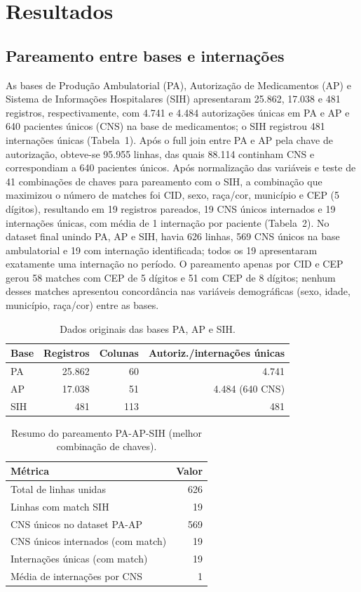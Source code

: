 \documentclass[11pt,a4paper]{article}
\begin{document}
\section*{Resultados}

\subsection*{Pareamento entre bases e internações}

As bases de Produção Ambulatorial (PA), Autorização de Medicamentos (AP) e Sistema de Informações Hospitalares (SIH) apresentaram 25.862, 17.038 e 481 registros, respectivamente, com 4.741 e 4.484 autorizações únicas em PA e AP e 640 pacientes únicos (CNS) na base de medicamentos; o SIH registrou 481 internações únicas (Tabela~1). Após o full join entre PA e AP pela chave de autorização, obteve-se 95.955 linhas, das quais 88.114 continham CNS e correspondiam a 640 pacientes únicos. Após normalização das variáveis e teste de 41 combinações de chaves para pareamento com o SIH, a combinação que maximizou o número de matches foi CID, sexo, raça/cor, município e CEP (5 dígitos), resultando em 19 registros pareados, 19 CNS únicos internados e 19 internações únicas, com média de 1 internação por paciente (Tabela~2). No dataset final unindo PA, AP e SIH, havia 626 linhas, 569 CNS únicos na base ambulatorial e 19 com internação identificada; todos os 19 apresentaram exatamente uma internação no período. O pareamento apenas por CID e CEP gerou 58 matches com CEP de 5 dígitos e 51 com CEP de 8 dígitos; nenhum desses matches apresentou concordância nas variáveis demográficas (sexo, idade, município, raça/cor) entre as bases.

\begin{table}[ht]
\centering
\caption{Dados originais das bases PA, AP e SIH.}
\label{tab:1}
\begin{tabular}{lrrr}
\toprule
\textbf{Base} & \textbf{Registros} & \textbf{Colunas} & \textbf{Autoriz./internações únicas} \\
\midrule
PA & 25.862 & 60 & 4.741 \\
AP & 17.038 & 51 & 4.484 (640 CNS) \\
SIH & 481 & 113 & 481 \\
\bottomrule
\end{tabular}
\end{table}

\begin{table}[ht]
\centering
\caption{Resumo do pareamento PA-AP-SIH (melhor combinação de chaves).}
\label{tab:2}
\begin{tabular}{lr}
\toprule
\textbf{Métrica} & \textbf{Valor} \\
\midrule
Total de linhas unidas & 626 \\
Linhas com match SIH & 19 \\
CNS únicos no dataset PA-AP & 569 \\
CNS únicos internados (com match) & 19 \\
Internações únicas (com match) & 19 \\
Média de internações por CNS & 1 \\
\bottomrule
\end{tabular}
\end{table}
\end{document}
